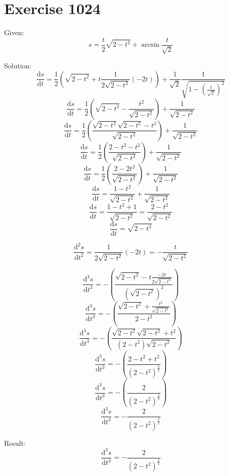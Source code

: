 \documentclass[a4paper, 10pt]{scrartcl}
\newcommand*\deriv{\mathrm{d}}
\begin{document}
\section{Exercise 1024}

Given:
\[
s = \frac{t}{2}\sqrt{2 - t^{2}} + \arcsin{\frac{t}{\sqrt{2}}}
\]

Solution:
\[
\frac{\deriv s}{\deriv t} = \frac{1}{2}(\sqrt{2 - t^{2}} + t\frac{1}{2\sqrt{2 - t^{2}}}(-2t)) + \frac{1}{\sqrt{2}}\frac{1}{\sqrt{1 - (\frac{t}{\sqrt{2}})^{2}}}
\]
\[
\frac{\deriv s}{\deriv t} = \frac{1}{2}(\sqrt{2 - t^{2}} - \frac{t^{2}}{\sqrt{2 - t^{2}}}) + \frac{1}{\sqrt{2 - t^{2}}}
\]
\[
\frac{\deriv s}{\deriv t} = \frac{1}{2}(\frac{\sqrt{2 - t^{2}}\sqrt{2 - t^{2}} - t^{2}}{\sqrt{2 - t^{2}}}) + \frac{1}{\sqrt{2 - t^{2}}}
\]
\[
\frac{\deriv s}{\deriv t} = \frac{1}{2}(\frac{2 - t^{2} - t^{2}}{\sqrt{2 - t^{2}}}) + \frac{1}{\sqrt{2 - t^{2}}}
\]
\[
\frac{\deriv s}{\deriv t} = \frac{1}{2}(\frac{2 - 2t^{2}}{\sqrt{2 - t^{2}}}) + \frac{1}{\sqrt{2 - t^{2}}}
\]
\[
\frac{\deriv s}{\deriv t} = \frac{1 - t^{2}}{\sqrt{2 - t^{2}}} + \frac{1}{\sqrt{2 - t^{2}}}
\]
\[
\frac{\deriv s}{\deriv t} = \frac{1 - t^{2} + 1}{\sqrt{2 - t^{2}}} = \frac{2 - t^{2}}{\sqrt{2 - t^{2}}}
\]
\[
\frac{\deriv s}{\deriv t} = \sqrt{2 - t^{2}}
\]

\[
\frac{\deriv^{2} s}{\deriv t^{2}} = \frac{1}{2\sqrt{2 - t^{2}}}(-2t) = -\frac{t}{\sqrt{2 - t^{2}}}
\]

\[
\frac{\deriv^{3} s}{\deriv t^{3}} = -\left(\frac{\sqrt{2 - t^{2}} - t\frac{-2t}{2\sqrt{2 - t^{2}}}}{(\sqrt{2 - t^{2}})^{2}}\right)
\]
\[
\frac{\deriv^{3} s}{\deriv t^{3}} = -\left(\frac{\sqrt{2 - t^{2}} + \frac{t^{2}}{\sqrt{2 - t^{2}}}}{2 - t^{2}}\right)
\]
\[
\frac{\deriv^{3} s}{\deriv t^{3}} = -\left(\frac{\sqrt{2 - t^{2}}\sqrt{2 - t^{2}} + t^{2}}{(2 - t^{2})\sqrt{2 - t^{2}}}\right)
\]
\[
\frac{\deriv^{3} s}{\deriv t^{3}} = -\left(\frac{2 - t^{2} + t^{2}}{(2 - t^{2})^\frac{3}{2}}\right)
\]
\[
\frac{\deriv^{3} s}{\deriv t^{3}} = -\left(\frac{2}{(2 - t^{2})^\frac{3}{2}}\right)
\]
\[
\frac{\deriv^{3} s}{\deriv t^{3}} = -\frac{2}{(2 - t^{2})^\frac{3}{2}}
\]

Result:
\[
\frac{\deriv^{3} s}{\deriv t^{3}} = -\frac{2}{(2 - t^{2})^\frac{3}{2}}
\]
\end{document}
